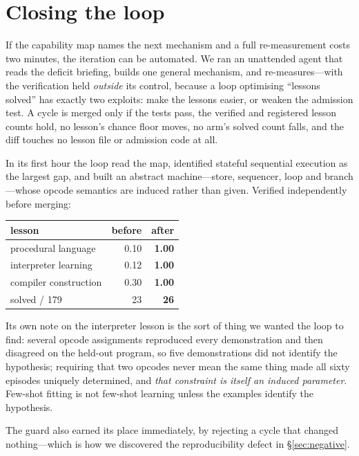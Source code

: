 \documentclass[11pt]{article}
\begin{document}
\section{Closing the loop}
\label{sec:loop}

If the capability map names the next mechanism and a full re-measurement costs two
minutes, the iteration can be automated. We ran an unattended agent that reads the
deficit briefing, builds one general mechanism, and re-measures---with the
verification held \emph{outside} its control, because a loop optimising ``lessons
solved'' has exactly two exploits: make the lessons easier, or weaken the
admission test. A cycle is merged only if the tests pass, the verified and
registered lesson counts hold, no lesson's chance floor moves, no arm's solved
count falls, and the diff touches no lesson file or admission code at all.

In its first hour the loop read the map, identified stateful sequential execution
as the largest gap, and built an abstract machine---store, sequencer, loop and
branch---whose opcode semantics are induced rather than given. Verified
independently before merging:

\begin{center}\small
\begin{tabular}{lrr}
\toprule
lesson & before & after\\
\midrule
procedural language     & 0.10 & \bf 1.00\\
interpreter learning    & 0.12 & \bf 1.00\\
compiler construction   & 0.30 & \bf 1.00\\
\midrule
solved / 179            & 23   & \bf 26\\
\bottomrule
\end{tabular}
\end{center}

\noindent Its own note on the interpreter lesson is the sort of thing we wanted
the loop to find: several opcode assignments reproduced every demonstration and
then disagreed on the held-out program, so five demonstrations did not identify
the hypothesis; requiring that two opcodes never mean the same thing made all
sixty episodes uniquely determined, and \emph{that constraint is itself an induced
parameter}. Few-shot fitting is not few-shot learning unless the examples
identify the hypothesis.

The guard also earned its place immediately, by rejecting a cycle that changed
nothing---which is how we discovered the reproducibility defect in
\S\ref{sec:negative}.
\end{document}
